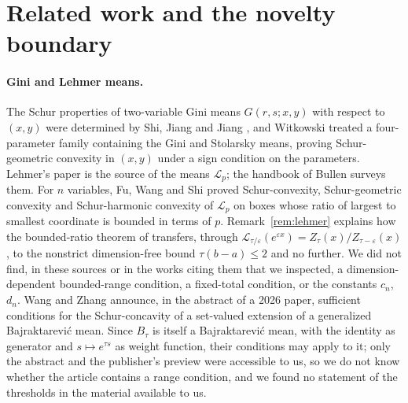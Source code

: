 \documentclass[11pt,a4paper]{article}
\theoremstyle{plain}
\theoremstyle{definition}
\begin{document}
\section{Related work and the novelty boundary}\label{sec:related}

\paragraph{Gini and Lehmer means.}
The Schur properties of two-variable Gini means $G(r,s;x,y)$ with respect to $(x,y)$ were determined by Shi, Jiang and Jiang \cite{ShiJiangJiang2009}, and Witkowski \cite{Witkowski2011} treated a four-parameter family containing the Gini and Stolarsky means, proving Schur-geometric convexity in $(x,y)$ under a sign condition on the parameters. Lehmer's paper \cite{Lehmer1971} is the source of the means $\mathcal{L}_p$; the handbook of Bullen \cite{Bullen2003} surveys them. For $n$ variables, Fu, Wang and Shi \cite{FuWangShi2016} proved Schur-convexity, Schur-geometric convexity and Schur-harmonic convexity of $\mathcal{L}_p$ on boxes whose ratio of largest to smallest coordinate is bounded in terms of $p$. Remark~\ref{rem:lehmer} explains how the bounded-ratio theorem of \cite{FuWangShi2016} transfers, through $\mathcal{L}_{\tau/\varepsilon}(e^{\varepsilon x})=Z_\tau(x)/Z_{\tau-\varepsilon}(x)$, to the nonstrict dimension-free bound $\tau(b-a)\le 2$ and no further. We did not find, in these sources or in the works citing them that we inspected, a dimension-dependent bounded-range condition, a fixed-total condition, or the constants $c_n$, $d_n$. Wang and Zhang \cite{WangZhang2026} announce, in the abstract of a 2026 paper, sufficient conditions for the Schur-concavity of a set-valued extension of a generalized Bajraktarevi\'c mean. Since $B_\tau$ is itself a Bajraktarevi\'c mean, with the identity as generator and $s\mapsto e^{\tau s}$ as weight function, their conditions may apply to it; only the abstract and the publisher's preview were accessible to us, so we do not know whether the article contains a range condition, and we found no statement of the thresholds in the material available to us.
\end{document}
